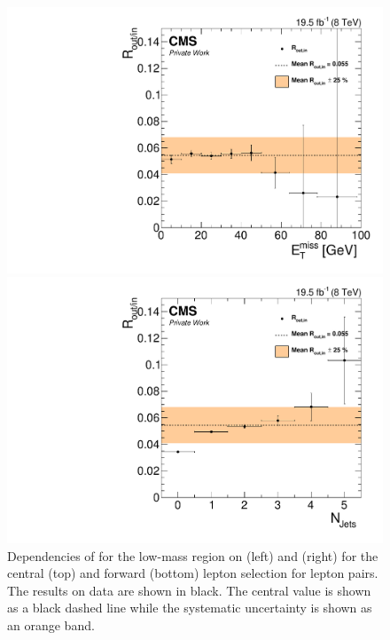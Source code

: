 \begin{figure}[htbp]
\begin{minipage}[t]{0.49\textwidth}
  \includegraphics[width=\textwidth]{plots/BG/rOutIn/rOutInSyst_DrellYanControlForward_Full2012_MET_LowMass_EE_None.pdf}
\end{minipage}
\begin{minipage}[t]{0.49\textwidth}
\includegraphics[width=\textwidth]{plots/BG/rOutIn/rOutInSyst_DrellYanControlForward_Full2012_NJets_LowMass_EE_None.pdf}
\end{minipage}
\caption{Dependencies of \Routin for the low-mass region on \MET (left) and \njets (right) for the central (top) and forward (bottom) lepton selection for \EE lepton pairs. The results on data are shown in black. The central value is shown as a black dashed line while the systematic uncertainty is shown as an orange band.}
\label{fig:ROutInDependencies3}
\end{figure} 



